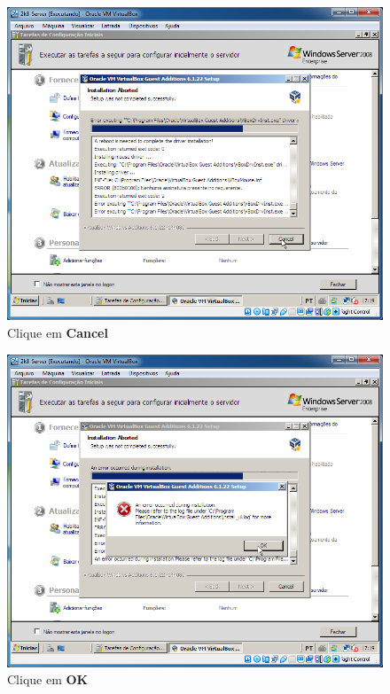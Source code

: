 \documentclass[10pt]{article}
\begin{document}
\begin{figure}[H]
    \centering
    \caption{Clique em \textbf{Cancel}}
    \label{fig:3137}
    \includegraphics[width=\linewidth]{images/ativacao_das_maquinas_virtuais/configuracao_inicial_das_maquinas_virtuais/037.png}
\end{figure}
\begin{figure}[H]
    \centering
    \caption{Clique em \textbf{OK}}
    \label{fig:3138}
    \includegraphics[width=\linewidth]{images/ativacao_das_maquinas_virtuais/configuracao_inicial_das_maquinas_virtuais/038.png}
\end{figure}
\end{document}
